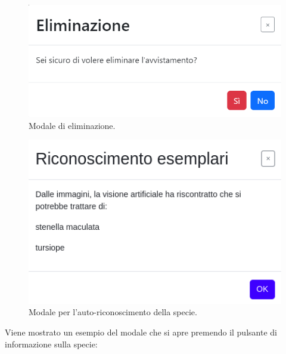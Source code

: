 \documentclass[a4paper,final,12pt]{report}
\begin{document}
\begin{figure}[hbtp]
\centering
\includegraphics[scale=0.44]{img_concettuale/eliminazione.png}
\caption{Modale di eliminazione.}
\end{figure}
\begin{figure}[hbtp]
\centering
\includegraphics[scale=0.40]{img_concettuale/autoric.png}
\caption{Modale per l'auto-riconoscimento della specie.}
\end{figure}
\newpage
Viene mostrato un esempio del modale che si apre premendo il pulsante di informazione sulla specie:
\end{document}
